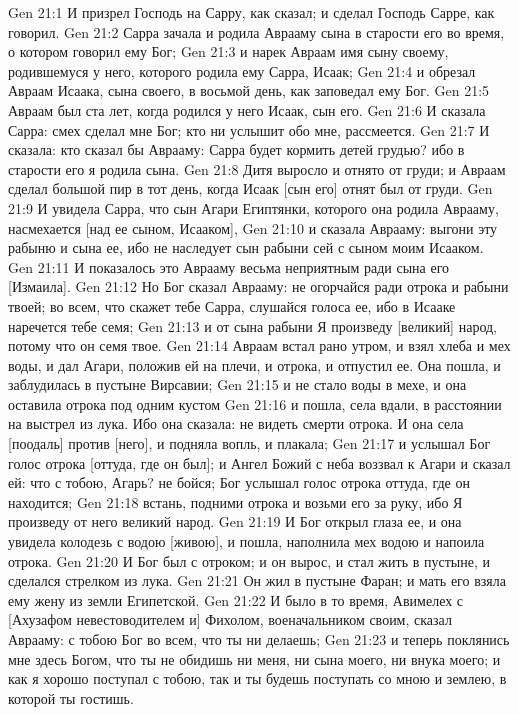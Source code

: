 \vs Gen 21:1 И призрел Господь на Сарру, как сказал; и сделал Господь Сарре, как говорил.
\vs Gen 21:2 Сарра зачала и родила Аврааму сына в старости его во время, о котором говорил ему Бог;
\vs Gen 21:3 и нарек Авраам имя сыну своему, родившемуся у него, которого родила ему Сарра, Исаак;
\vs Gen 21:4 и обрезал Авраам Исаака, сына своего, в восьмой день, как заповедал ему Бог.
\vs Gen 21:5 Авраам был ста лет, когда родился у него Исаак, сын его.
\vs Gen 21:6 И сказала Сарра: смех сделал мне Бог; кто ни услышит обо мне, рассмеется.
\vs Gen 21:7 И сказала: кто сказал бы Аврааму: Сарра будет кормить детей грудью? ибо в старости его я родила сына.
\vs Gen 21:8 Дитя выросло и отнято от груди; и Авраам сделал большой пир в тот день, когда Исаак [сын его] отнят был от груди.
\rsbpar\vs Gen 21:9 И увидела Сарра, что сын Агари Египтянки, которого она родила Аврааму, насмехается [над ее сыном, Исааком],
\vs Gen 21:10 и сказала Аврааму: выгони эту рабыню и сына ее, ибо не наследует сын рабыни сей с сыном моим Исааком.
\vs Gen 21:11 И показалось это Аврааму весьма неприятным ради сына его [Измаила].
\vs Gen 21:12 Но Бог сказал Аврааму: не огорчайся ради отрока и рабыни твоей; во всем, что скажет тебе Сарра, слушайся голоса ее, ибо в Исааке наречется тебе семя;
\vs Gen 21:13 и от сына рабыни Я произведу [великий] народ, потому что он семя твое.
\vs Gen 21:14 Авраам встал рано утром, и взял хлеба и мех воды, и дал Агари, положив ей на плечи, и отрока, и отпустил ее. Она пошла, и заблудилась в пустыне Вирсавии;
\vs Gen 21:15 и не стало воды в мехе, и она оставила отрока под одним кустом
\vs Gen 21:16 и пошла, села вдали, в расстоянии на  выстрел из лука. Ибо она сказала: не  видеть смерти отрока. И она села [поодаль] против [него], и подняла вопль, и плакала;
\vs Gen 21:17 и услышал Бог голос отрока [оттуда, где он был]; и Ангел Божий с неба воззвал к Агари и сказал ей: что с тобою, Агарь? не бойся; Бог услышал голос отрока оттуда, где он находится;
\vs Gen 21:18 встань, подними отрока и возьми его за руку, ибо Я произведу от него великий народ.
\vs Gen 21:19 И Бог открыл глаза ее, и она увидела колодезь с водою [живою], и пошла, наполнила мех водою и напоила отрока.
\vs Gen 21:20 И Бог был с отроком; и он вырос, и стал жить в пустыне, и сделался стрелком из лука.
\vs Gen 21:21 Он жил в пустыне Фаран; и мать его взяла ему жену из земли Египетской.
\rsbpar\vs Gen 21:22 И было в то время, Авимелех с [Ахузафом невестоводителем и] Фихолом, военачальником своим, сказал Аврааму: с тобою Бог во всем, что ты ни делаешь;
\vs Gen 21:23 и теперь поклянись мне здесь Богом, что ты не обидишь ни меня, ни сына моего, ни внука моего; и как я хорошо поступал с тобою, так и ты будешь поступать со мною и землею, в которой ты гостишь.
